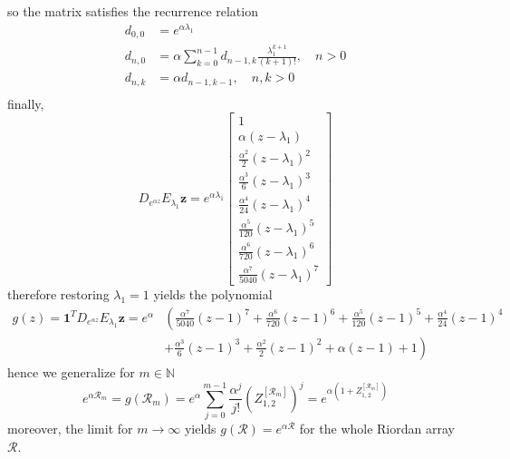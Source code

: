 so the matrix satisfies the recurrence relation
\begin{displaymath}
\begin{split}
d_{0,0}&=e^{\alpha \lambda_{1}}\\
d_{n,0}&=\alpha\sum_{k=0}^{n-1}{d_{n-1, k}\frac{\lambda_{1}^{k+1}}{(k+1)!}}, \quad n>0 \\
d_{n,k}&=\alpha d_{n-1, k-1}, \quad n,k > 0\\
\end{split}
\end{displaymath}
finally,
\begin{displaymath}
D_{e^{\alpha z}}E_{\lambda_{1}}\boldsymbol{z} = e^{\alpha \lambda_{1}}\left[\begin{matrix}1\\\alpha \left(z - \lambda_{1}\right) \\\frac{\alpha^{2}}{2} \left(z - \lambda_{1}\right)^{2} \\\frac{\alpha^{3}}{6} \left(z - \lambda_{1}\right)^{3} \\\frac{\alpha^{4}}{24} \left(z - \lambda_{1}\right)^{4} \\\frac{\alpha^{5}}{120} \left(z - \lambda_{1}\right)^{5} \\\frac{\alpha^{6}}{720} \left(z - \lambda_{1}\right)^{6} \\\frac{\alpha^{7}}{5040} \left(z - \lambda_{1}\right)^{7} \end{matrix}\right]
\end{displaymath}
therefore restoring $\lambda_{1}=1$ yields the polynomial
\begin{displaymath}
\begin{split}
g{\left (z \right )} = \boldsymbol{1}^{T}D_{e^{\alpha z}}E_{\lambda_{1}}\boldsymbol{z} = e^{\alpha} &\left(\frac{\alpha^{7} }{5040} \left(z - 1\right)^{7} + \frac{\alpha^{6} }{720} \left(z - 1\right)^{6} + \frac{\alpha^{5} }{120} \left(z - 1\right)^{5} + \frac{\alpha^{4} }{24} \left(z - 1\right)^{4}\right.\\
    &+ \left. \frac{\alpha^{3} }{6} \left(z - 1\right)^{3} + \frac{\alpha^{2} }{2} \left(z - 1\right)^{2} + \alpha \left(z - 1\right)  + 1\right)
\end{split}
\end{displaymath}
hence we generalize for $m\in\mathbb{N}$
\begin{displaymath}
e^{\alpha \mathcal{R}_{m}} = g{\left (\mathcal{R}_{m} \right )} =e^{\alpha} \sum_{j=0}^{m-1}{\frac{\alpha^{j}}{j!}{\left(Z_{1,2}^{[\mathcal{R}_{m}]}\right)^{j} }} = e^{\alpha\left(1+Z_{1,2}^{[\mathcal{R}_{m}]}\right)}
\end{displaymath}
moreover, the limit for $m \rightarrow \infty$ yields $ g{\left (\mathcal{R} \right )} = e^{\alpha \mathcal{R}} $ for the whole Riordan array $\mathcal{R}$.
